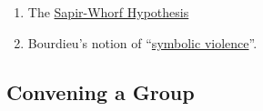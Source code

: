\begin{enumerate}
\item
  The \href{http://en.wikipedia.org/wiki/Linguistic\_relativity}{Sapir-Whorf
  Hypothesis}
\item
  Bourdieu's notion of
  ``\href{http://en.wikipedia.org/wiki/Symbolic\_violence}{symbolic
  violence}''.
\end{enumerate}
\subsection{Convening a Group}

